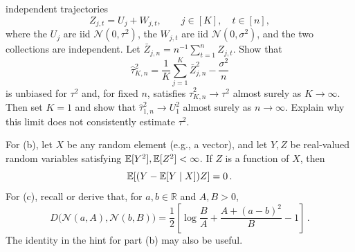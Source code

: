 \begin{exercisechunk}
\begin{enumerate}[(a),beginpenalty=10000]
independent trajectories
\[
 Z_{j,t}=U_j+W_{j,t},\qquad j\in[K],\quad t\in[n],
\]
where the \(U_j\) are iid \(\mathcal N(0,\tau^2)\), the \(W_{j,t}\) are iid
\(\mathcal N(0,\sigma^2)\), and the two collections are independent. Let
\(\bar Z_{j,n}=n^{-1}\sum_{t=1}^n Z_{j,t}\). Show that
\[
 \widehat\tau_{K,n}^2
 =\frac1K\sum_{j=1}^K\bar Z_{j,n}^2-\frac{\sigma^2}{n}
\]
is unbiased for \(\tau^2\) and, for fixed \(n\), satisfies
\(\widehat\tau_{K,n}^2\to\tau^2\) almost surely as \(K\to\infty\). Then set
\(K=1\) and show that
\(\widehat\tau_{1,n}^2\to U_1^2\) almost surely as \(n\to\infty\). Explain
why this limit does not consistently estimate \(\tau^2\).
\end{enumerate}

\begin{hints}
For (b), let \(X\) be any random element (e.g., a vector), and let \(Y,Z\)
be real-valued random variables satisfying
\(\mathbb E[Y^2],\mathbb E[Z^2]<\infty\). If \(Z\) is a function of \(X\), then
\[
\mathbb E\!\left[(Y-\mathbb E[Y\mid X])Z\right]=0\,.
\]
For (c),
recall or derive that, for \(a,b\in\mathbb R\) and \(A,B>0\),
\[
 D\bigl(\mathcal N(a,A),\mathcal N(b,B)\bigr)
 =\frac12\left[\log\frac{B}{A}
 +\frac{A+(a-b)^2}{B}-1\right]\,.
\]
The identity in the hint for part (b) may also be useful.
\end{hints}
\end{exercisechunk}
